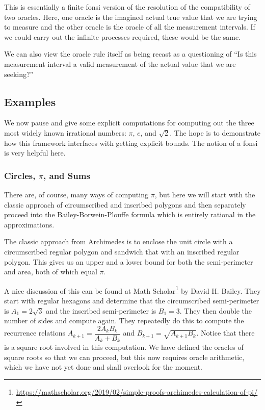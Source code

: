 \documentclass[12pt]{article}
\begin{document}
This is essentially a finite fonsi version of the resolution of the compatibility of two oracles. Here, one oracle is the imagined actual true value that we are trying to measure and the other oracle is the oracle of all the measurement intervals. If we could carry out the infinite processes required, these would be the same. 

We can also view the oracle rule itself as being recast as a questioning of ``Is this measurement interval a valid measurement of the actual value that we are seeking?''

\subsection{Examples}


We now pause and give some explicit computations for computing out the three most widely known irrational numbers: $\pi$, $e$, and $\sqrt{2}$. The hope is to demonstrate how this framework interfaces with getting explicit bounds. The notion of a fonsi is very helpful here. 

\subsubsection{Circles, \texorpdfstring{$\pi$}{pi}, and Sums}

There are, of course, many ways of computing $\pi$, but here we will start with the classic approach of circumscribed and inscribed polygons and then separately proceed into the Bailey-Borwein-Plouffe formula which is entirely rational in the approximations. 

The classic approach from Archimedes is to enclose the unit circle with a circumscribed regular polygon and sandwich that with an inscribed regular polygon. This gives us an upper and a lower bound for both the semi-perimeter and area, both of which equal $\pi$. 

A nice discussion of this can be found at Math Scholar\footnote{\url{https://mathscholar.org/2019/02/simple-proofs-archimedes-calculation-of-pi/}} by David H. Bailey. They start with regular hexagons and determine that the circumscribed semi-perimeter is $A_1 = 2 \sqrt{3}$ and the inscribed semi-perimeter is $B_1 = 3$. They then double the number of sides and compute again. They repeatedly do this to compute the recurrence relations $A_{k+1} = \dfrac{2A_k B_k}{A_k + B_k}$ and $B_{k+1} = \sqrt{A_{k+1}B_k}$. Notice that there is a square root involved in this computation. We have defined the oracles of square roots so that we can proceed, but this now requires oracle arithmetic, which we have not yet done and shall overlook for the moment.  
\end{document}
